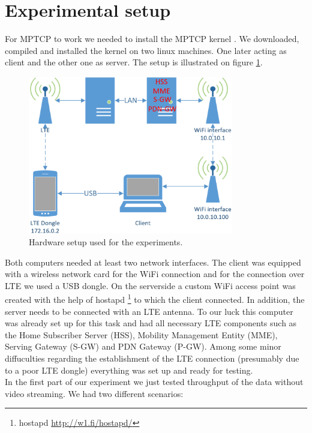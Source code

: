 \documentclass{llncs}
\begin{document}
\section{Experimental setup}
For MPTCP to work we needed to install the MPTCP kernel \cite{linuxMPTCP}.
We downloaded, compiled and installed the kernel on two linux machines. One later acting as client and the other one as server. The setup is illustrated on figure \ref{fig:setup}.\\


\begin{figure}[H]
\centering
\includegraphics[width=0.8\textwidth]{setup.png}
\caption{\label{fig:setup} Hardware setup used for the experiments.}
\end{figure}

Both computers needed at least two network interfaces. The client was equipped with a wireless network card for the WiFi connection and for the connection over LTE we used a USB dongle. On the serverside a custom WiFi access point was created with the help of hostapd \footnote{hostapd \url{http://w1.fi/hostapd/}} to which the client connected. In addition, the server needs to be connected with an LTE antenna. To our luck this computer was already set up for this task and had all necessary LTE components such as the Home Subscriber Server (HSS), Mobility Management Entity (MME), Serving Gateway (S-GW) and PDN Gateway (P-GW). Among some minor diffuculties regarding the establishment of the LTE connection (presumably
 due to a poor LTE dongle) everything was set up and ready for testing.\\

In the first part of our experiment we just tested throughput of the data without video streaming. We had two different scenarios:
\end{document}
